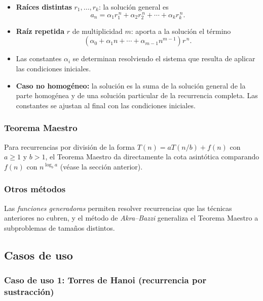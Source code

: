 \documentclass{article}
\begin{document}
        \begin{itemize}
        \item \textbf{Raíces distintas} $r_1, \ldots, r_k$: la solución general es
                \[
                a_n = \alpha_1 r_1^{\,n} + \alpha_2 r_2^{\,n} + \cdots + \alpha_k r_k^{\,n}.
                \]
        \item \textbf{Raíz repetida} $r$ de multiplicidad $m$: aporta a la solución
                el término
                \[
                \left(\alpha_0 + \alpha_1 n + \cdots + \alpha_{m-1} n^{m-1}\right) r^{\,n}.
                \]
        \item Las constantes $\alpha_i$ se determinan resolviendo el sistema que
                resulta de aplicar las condiciones iniciales.
        \item \textbf{Caso no homogéneo:} la solución es la suma de la solución
                general de la parte homogénea y de una solución particular de la
                recurrencia completa. Las constantes se ajustan al final con las
                condiciones iniciales.
        \end{itemize}
        
        \subsubsection{Teorema Maestro}
        
        Para recurrencias por división de la forma $T(n) = aT(n/b) + f(n)$ con
        $a \geq 1$ y $b > 1$, el Teorema Maestro da directamente la cota asintótica
        comparando $f(n)$ con $n^{\log_b a}$ (véase la sección anterior).
        
        \subsubsection{Otros métodos}
        
        Las \emph{funciones generadoras} permiten resolver recurrencias que las técnicas
        anteriores no cubren, y el método de \emph{Akra--Bazzi} generaliza el Teorema
        Maestro a subproblemas de tamaños distintos.
        
        \subsection{Casos de uso}
        
        \subsubsection{Caso de uso 1: Torres de Hanoi (recurrencia por sustracción)}
        
\end{document}
